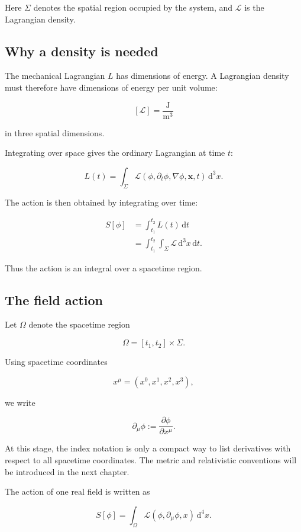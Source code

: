 Here \(\Sigma\) denotes the spatial region occupied by the system, and \(\mathcal{L}\) is the Lagrangian density.

\subsection{Why a density is needed}

The mechanical Lagrangian \(L\) has dimensions of energy. A Lagrangian density must therefore have dimensions of energy per unit volume:

\[
[\mathcal{L}]
=
\frac{\mathrm{J}}{\mathrm{m}^{3}}
\]

in three spatial dimensions.

Integrating over space gives the ordinary Lagrangian at time \(t\):

\[
L(t)
=
\int_{\Sigma}
\mathcal{L}(\phi,\partial_{t}\phi,\nabla\phi,\mathbf{x},t)
\,\mathrm{d}^{3}x.
\]

The action is then obtained by integrating over time:

\[
\begin{aligned}
S[\phi]
&=
\int_{t_{1}}^{t_{2}}L(t)\,\mathrm{d}t\\
&=
\int_{t_{1}}^{t_{2}}
\int_{\Sigma}
\mathcal{L}
\,\mathrm{d}^{3}x\,\mathrm{d}t.
\end{aligned}
\]

Thus the action is an integral over a spacetime region.

\subsection{The field action}

Let \(\Omega\) denote the spacetime region

\[
\Omega=[t_{1},t_{2}]\times\Sigma.
\]

Using spacetime coordinates

\[
x^{\mu}=(x^{0},x^{1},x^{2},x^{3}),
\]

we write

\[
\partial_{\mu}\phi
:=
\frac{\partial\phi}{\partial x^{\mu}}.
\]

At this stage, the index notation is only a compact way to list derivatives with respect to all spacetime coordinates. The metric and relativistic conventions will be introduced in the next chapter.

The action of one real field is written as

\[
\boxed{
S[\phi]
=
\int_{\Omega}
\mathcal{L}(\phi,\partial_{\mu}\phi,x)
\,\mathrm{d}^{4}x
}.
\]

